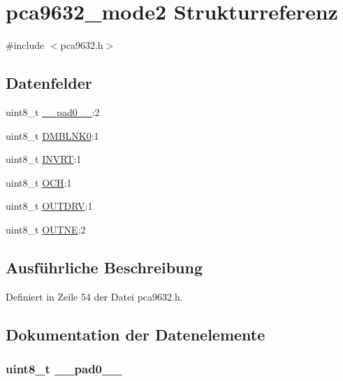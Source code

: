 \hypertarget{structpca9632__mode2}{}\section{pca9632\+\_\+mode2 Strukturreferenz}
\label{structpca9632__mode2}


{\ttfamily \#include $<$pca9632.\+h$>$}

\subsection*{Datenfelder}
\begin{DoxyCompactItemize}
\item 
uint8\+\_\+t \hyperlink{structpca9632__mode2_a8b4eebe79ded0459acec2f4950102ba3}{\+\_\+\+\_\+pad0\+\_\+\+\_\+}\+:2
\item 
uint8\+\_\+t \hyperlink{structpca9632__mode2_a583f0c01b7fec1b5ab18192c1f70e317}{D\+M\+B\+L\+N\+K0}\+:1
\item 
uint8\+\_\+t \hyperlink{structpca9632__mode2_aa0cc6492902abe86e827dbdcc3bd30ab}{I\+N\+V\+R\+T}\+:1
\item 
uint8\+\_\+t \hyperlink{structpca9632__mode2_a5858103b8db2d73b32003ae6171c799d}{O\+C\+H}\+:1
\item 
uint8\+\_\+t \hyperlink{structpca9632__mode2_a43c059476c30e0592582328edb231ded}{O\+U\+T\+D\+R\+V}\+:1
\item 
uint8\+\_\+t \hyperlink{structpca9632__mode2_a2139d067da297c9598488f1d9332a6a7}{O\+U\+T\+N\+E}\+:2
\end{DoxyCompactItemize}


\subsection{Ausführliche Beschreibung}


Definiert in Zeile 54 der Datei pca9632.\+h.



\subsection{Dokumentation der Datenelemente}
\hypertarget{structpca9632__mode2_a8b4eebe79ded0459acec2f4950102ba3}{}
\subsubsection[{\+\_\+\+\_\+pad0\+\_\+\+\_\+}]{\setlength{\rightskip}{0pt plus 5cm}uint8\+\_\+t \+\_\+\+\_\+pad0\+\_\+\+\_\+}\label{structpca9632__mode2_a8b4eebe79ded0459acec2f4950102ba3}


